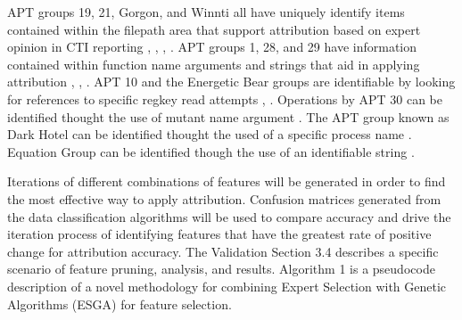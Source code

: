 \documentclass[12pt]{report}
\begin{document}
APT groups 19, 21, Gorgon, and Winnti all have uniquely identify items contained within the filepath area that support attribution based on expert opinion in CTI reporting \cite{DeepPanda2013}, \cite{ExploringBergard2016}, \cite{NewDerusbiFamily2015}, \cite{APT_Attacks2013}.  APT groups 1, 28, and 29 have information contained within function name arguments and strings that aid in applying attribution \cite{APT1Mandiant2013}, \cite{SofacyActivity2018}, \cite{DukeAPTcloudLin2015}.  APT 10 and the Energetic Bear groups are identifiable by looking for references to specific regkey read attempts \cite{OperationCloudHopperIoCs2017}, \cite{CrouchingYeti2014}.  Operations by APT 30 can be identified thought the use of mutant name argument \cite{APT30IoCs2015}.  The APT group known as Dark Hotel can be identified thought the used of a specific process name \cite{DarkHotelIoCs2014}.  Equation Group can be identified though the use of an identifiable string \cite{EquationSamples2015}.

Iterations of different combinations of features will be generated  in order to find the most effective way to apply attribution.  Confusion matrices generated from the data classification algorithms will be used to compare accuracy and drive the iteration process of identifying features that have the greatest rate of positive change for attribution accuracy.  The Validation Section 3.4 describes a specific scenario of feature pruning, analysis, and results.  Algorithm 1 is a pseudocode description of a novel methodology for combining Expert Selection with Genetic Algorithms (ESGA) for feature selection.
\end{document}
